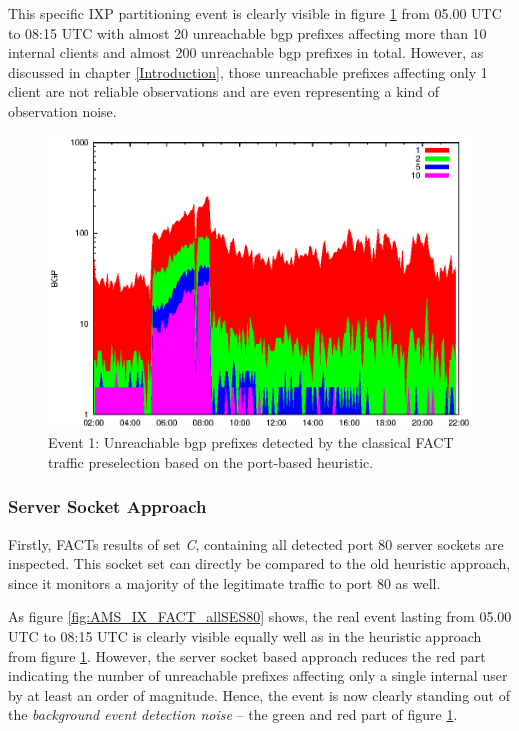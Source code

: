 This specific IXP partitioning event is clearly visible in figure \ref{fig:AMS_IX_FACT_REF} from 05.00 UTC to 08:15 UTC with almost 20 unreachable \gls{bgp} prefixes affecting more than 10 internal clients and almost 200 unreachable \gls{bgp} prefixes in total. 
However, as discussed in chapter \ref{Introduction}, those unreachable prefixes affecting only 1 client are not reliable observations and are even representing a kind of observation noise. 
\begin{figure}
	[p] \centering 
	\includegraphics[width=0.75\linewidth]{images/events/2010_03_25/bgp_log_port80_ref.eps} \caption{Event 1: Unreachable \gls{bgp} prefixes detected by the classical \gls{FACT} traffic preselection based on the port-based heuristic.} 
	\label{fig:AMS_IX_FACT_REF} 
\end{figure}

\subsubsection{Server Socket Approach}

Firstly, \gls{FACT}s results of set \emph{C}, containing all detected port 80 \glspl{server socket} are inspected. 
This socket set can directly be compared to the old heuristic approach, since it monitors a majority of the legitimate traffic to port 80 as well. 

As figure \ref{fig:AMS_IX_FACT_allSES80} shows, the real event lasting from 05.00 UTC to 08:15 UTC is clearly visible equally well as in the heuristic approach from figure \ref{fig:AMS_IX_FACT_REF}. 
However, the \gls{server socket} based approach reduces the red part indicating the number of unreachable prefixes affecting only a single internal user by at least an order of magnitude. 
Hence, the event is now clearly standing out of the \emph{background event detection noise} -- the green and red part of figure \ref{fig:AMS_IX_FACT_REF}. 


